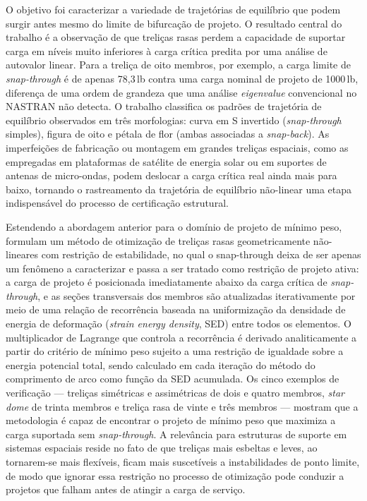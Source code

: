 \noindent O objetivo foi caracterizar a variedade de trajetórias de equilíbrio que podem surgir antes mesmo do limite de bifurcação de projeto. O resultado central do trabalho é a observação de que treliças rasas perdem a capacidade de suportar carga em níveis muito inferiores à carga crítica predita por uma análise de autovalor linear. Para a treliça de oito membros, por exemplo, a carga limite de \textit{snap-through} é de apenas 78{,}3\,lb contra uma carga nominal de projeto de 1000\,lb, diferença de uma ordem de grandeza que uma análise \textit{eigenvalue} convencional no NASTRAN não detecta. O trabalho classifica os padrões de trajetória de equilíbrio observados em três morfologias: curva em S invertido (\textit{snap-through} simples), figura de oito e pétala de flor (ambas associadas a \textit{snap-back}). As imperfeições de fabricação ou montagem em grandes treliças espaciais, como as empregadas em plataformas de satélite de energia solar ou em suportes de antenas de micro-ondas, podem deslocar a carga crítica real ainda mais para baixo, tornando o rastreamento da trajetória de equilíbrio não-linear uma etapa indispensável do processo de certificação estrutural.

Estendendo a abordagem anterior para o domínio de projeto de mínimo peso, \citet{hrinda_nguyen2008} formulam um método de otimização de treliças rasas geometricamente não-lineares com restrição de estabilidade, no qual o snap-through deixa de ser apenas um fenômeno a caracterizar e passa a ser tratado como restrição de projeto ativa: a carga de projeto é posicionada imediatamente abaixo da carga crítica de \textit{snap-through}, e as seções transversais dos membros são atualizadas iterativamente por meio de uma relação de recorrência baseada na uniformização da densidade de energia de deformação (\textit{strain energy density}, SED) entre todos os elementos. O multiplicador de Lagrange que controla a recorrência é derivado analiticamente a partir do critério de mínimo peso sujeito a uma restrição de igualdade sobre a energia potencial total, sendo calculado em cada iteração do método do comprimento de arco como função da SED acumulada. Os cinco exemplos de verificação --- treliças simétricas e assimétricas de dois e quatro membros, \textit{star dome} de trinta membros e treliça rasa de vinte e três membros --- mostram que a metodologia é capaz de encontrar o projeto de mínimo peso que maximiza a carga suportada sem \textit{snap-through}. A relevância para estruturas de suporte em sistemas espaciais reside no fato de que treliças mais esbeltas e leves, ao tornarem-se mais flexíveis, ficam mais suscetíveis a instabilidades de ponto limite, de modo que ignorar essa restrição no processo de otimização pode conduzir a projetos que falham antes de atingir a carga de serviço.

